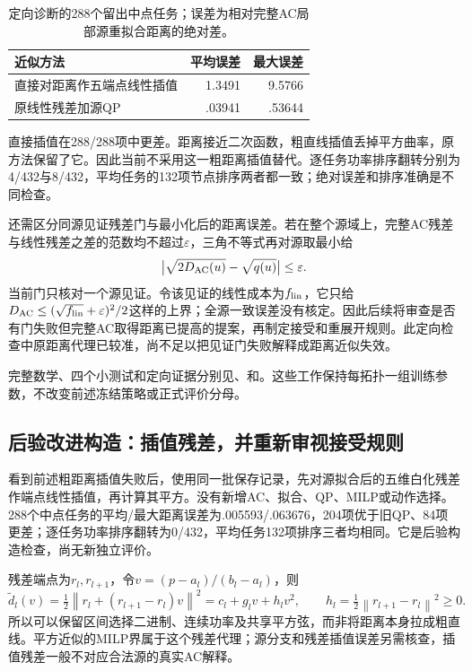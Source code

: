 \documentclass[UTF8,fontset=fandol,11pt,a4paper]{ctexart}
\newcommand{\norm}[1]{\left\lVert#1\right\rVert}
\begin{document}
\begin{table}[htbp]\centering\small
\caption{定向诊断的288个留出中点任务；误差为相对完整AC局部源重拟合距离的绝对差。}
\begin{tabular}{lrr}\toprule
近似方法 & 平均误差 & 最大误差\\\midrule
直接对距离作五端点线性插值 & 1.3491 & 9.5766\\
原线性残差加源QP & .03941 & .53644\\
\bottomrule\end{tabular}
\end{table}

直接插值在288/288项中更差。距离接近二次函数，粗直线插值丢掉平方曲率，原方法保留了它。因此当前不采用这一粗距离插值替代。逐任务功率排序翻转分别为4/432与8/432，平均任务的132项节点排序两者都一致；绝对误差和排序准确是不同检查。

还需区分同源见证残差门与最小化后的距离误差。若在整个源域上，完整AC残差与线性残差之差的范数均不超过$\varepsilon$，三角不等式再对源取最小给
\[
 \big|\sqrt{2D_{\rm AC}(u)}-\sqrt{q(u)}\big|\le\varepsilon.
\]
当前门只核对一个源见证。令该见证的线性成本为$f_{\rm lin}$，它只给$D_{\rm AC}\le(\sqrt{f_{\rm lin}}+\varepsilon)^2/2$这样的上界；全源一致误差没有核定。因此后续将审查是否有门失败但完整AC取得距离已提高的提案，再制定接受和重展开规则。此定向检查中原距离代理已较准，尚不足以把见证门失败解释成距离近似失效。

完整数学、四个小测试和定向证据分别见、和。这些工作保持每拓扑一组训练参数，不改变前述冻结策略或正式评价分母。

\subsection{后验改进构造：插值残差，并重新审视接受规则}
看到前述粗距离插值失败后，使用同一批保存记录，先对源拟合后的五维白化残差作端点线性插值，再计算其平方。没有新增AC、拟合、QP、MILP或动作选择。288个中点任务的平均/最大距离误差为.005593/.063676，204项优于旧QP、84项更差；逐任务功率排序翻转为0/432，平均任务132项排序三者均相同。它是后验构造检查，尚无新独立评价。

残差端点为$r_l,r_{l+1}$，令$v=(p-a_l)/(b_l-a_l)$，则
\[
 \tilde d_l(v)=\tfrac12\norm{r_l+(r_{l+1}-r_l)v}^2
 =c_l+g_lv+h_lv^2,\qquad h_l=\tfrac12\norm{r_{l+1}-r_l}^2\ge0.
\]
所以可以保留区间选择二进制、连续功率及共享平方弦，而非将距离本身拉成粗直线。平方近似的MILP界属于这个残差代理；源分支和残差插值误差另需核查，插值残差一般不对应合法源的真实AC解释。
\end{document}
